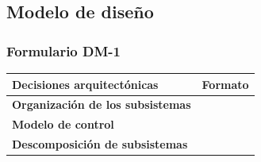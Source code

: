 \documentclass[a4paper,11pt]{article}
\begin{document}
		\subsection{Modelo de diseño}
			\subsubsection{Formulario DM-1}
			\begin{center}
				\begin{tabular}{| l | l |}
					\hline
					\textbf{Decisiones arquitectónicas} & \textbf{Formato} \\
					\hline
					\textbf{Organización de los subsistemas} & \\
					\hline
					\textbf{Modelo de control} & \\
					\hline
					\textbf{Descomposición de subsistemas} & \\
					\hline
				\end{tabular}
			\end{center}
			\newpage
\end{document}
